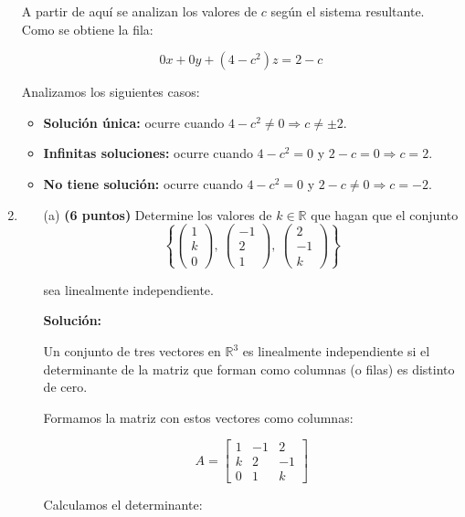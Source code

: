 \documentclass[a4paper]{article}
\begin{document}
\begin{enumerate}
A partir de aquí se analizan los valores de \( c \) según el sistema resultante. Como se obtiene la fila:

\[
0x + 0y + (4 - c^2)z = 2 - c
\]

Analizamos los siguientes casos:

\begin{itemize}
    \item \textbf{Solución única:} ocurre cuando \( 4 - c^2 \ne 0 \Rightarrow c \ne \pm 2 \).
    \item \textbf{Infinitas soluciones:} ocurre cuando \( 4 - c^2 = 0 \) y \( 2 - c = 0 \Rightarrow c = 2 \).
    \item \textbf{No tiene solución:} ocurre cuando \( 4 - c^2 = 0 \) y \( 2 - c \ne 0 \Rightarrow c = -2 \).
\end{itemize}
\newpage
\item
\begin{enumerate}
    \item[(a)] \textbf{(6 puntos)} Determine los valores de \( k \in \mathbb{R} \) que hagan que el conjunto
    \[
\left\{
\begin{pmatrix} 1 \\ k \\ 0 \end{pmatrix},\ 
\begin{pmatrix} -1 \\ 2 \\ 1 \end{pmatrix},\ 
\begin{pmatrix} 2 \\ -1 \\ k \end{pmatrix}
\right\}
\]

sea linealmente independiente.

\vspace{1em}

\textbf{Solución:}

Un conjunto de tres vectores en \( \mathbb{R}^3 \) es linealmente independiente si el determinante de la matriz que forman como columnas (o filas) es distinto de cero.

Formamos la matriz con estos vectores como columnas:

\[
A = \begin{bmatrix}
1 & -1 & 2 \\
k & 2 & -1 \\
0 & 1 & k
\end{bmatrix}
\]

Calculamos el determinante:


\end{enumerate}
\end{enumerate}
\end{document}
